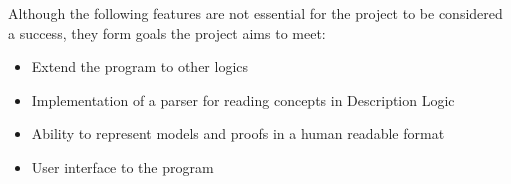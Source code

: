 
Although the following features are not essential for the project to be considered a success, they
form goals the project aims to meet:

\begin{itemize}
\item Extend the program to other logics
\item Implementation of a parser for reading concepts in Description Logic
\item Ability to represent models and proofs in a human readable format
\item User interface to the program
\end{itemize}
